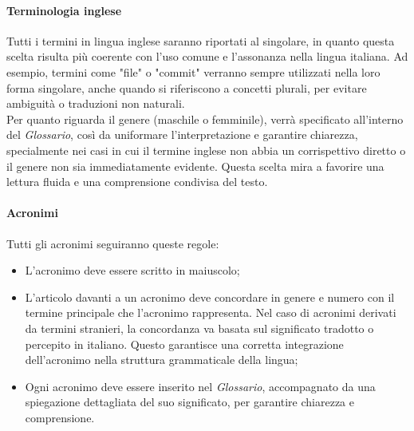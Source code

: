 \paragraph{Terminologia inglese}
Tutti i termini in lingua inglese saranno riportati al singolare, in quanto
questa scelta risulta più coerente con l'uso comune e l'assonanza nella lingua
italiana. Ad esempio, termini come "file" o "commit" verranno sempre utilizzati
nella loro forma singolare, anche quando si riferiscono a concetti plurali, per
evitare ambiguità o traduzioni non naturali.\\ Per quanto riguarda il genere
(maschile o femminile), verrà specificato all'interno del \textit{Glossario},
così da uniformare l'interpretazione e garantire chiarezza, specialmente nei
casi in cui il termine inglese non abbia un corrispettivo diretto o il genere
non sia immediatamente evidente. Questa scelta mira a favorire una lettura
fluida e una comprensione condivisa del testo.
\paragraph{Acronimi}
Tutti gli acronimi seguiranno queste regole:
\begin{itemize}
      \item L'acronimo deve essere scritto in maiuscolo;
      \item L'articolo davanti a un acronimo deve concordare in genere e numero con il
            termine principale che l'acronimo rappresenta. Nel caso di acronimi derivati da
            termini stranieri, la concordanza va basata sul significato tradotto o
            percepito in italiano. Questo garantisce una corretta integrazione
            dell'acronimo nella struttura grammaticale della lingua;
      \item Ogni acronimo deve essere inserito nel \textit{Glossario}, accompagnato da una
            spiegazione dettagliata del suo significato, per garantire chiarezza e
            comprensione.
\end{itemize}
